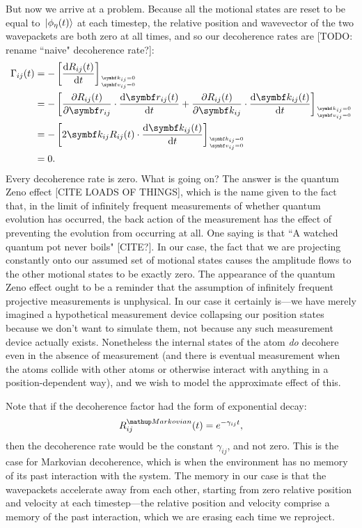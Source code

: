 But now we arrive at a problem. Because all the motional states are reset to be equal to $\ket{\phi_\eta(t)}$ at each timestep, the relative position and wavevector of the two wavepackets are both zero at all times, and so our decoherence rates are [TODO: rename ``naive" decoherence rate?]:
\begin{align}
\Gamma_{ij}(t) &= -\left[\dv{R_{ij}(t)}{t}\right]_{
\stackon[1pt]
{$\scriptscriptstyle\, \vec v_{ij} = 0$}
{$\scriptscriptstyle\, \vec k_{ij} = 0$}
}\\
&= -\left[
\pdv{R_{ij}(t)}{\vec r_{ij}}\cdot \dv{\vec r_{ij}(t)}{t} + 
\pdv{R_{ij}(t)}{\vec k_{ij}}\cdot \dv{\vec k_{ij}(t)}{t}\right]_{
\stackon[1pt]
{$\scriptscriptstyle\, \vec v_{ij} = 0$}
{$\scriptscriptstyle\, \vec k_{ij} = 0$}
}\\
&= -\left[
2\vec k_{ij}R_{ij}(t)\cdot\dv{\vec k_{ij}(t)}{t}\right]_{
\stackon[1pt]
{$\scriptscriptstyle\, \vec v_{ij} = 0$}
{$\scriptscriptstyle\, \vec k_{ij} = 0$}
}\\
&= 0.
\end{align}
Every decoherence rate is zero. What is going on? The answer is the quantum Zeno effect [CITE LOADS OF THINGS], which is the name given to the fact that, in the limit of infinitely frequent measurements of whether quantum evolution has occurred, the back action of the measurement has the effect of preventing the evolution from occurring at all. One saying is that ``A watched quantum pot never boils" [CITE?]. In our case, the fact that we are projecting constantly onto our assumed set of motional states causes the amplitude flows to the other motional states to be exactly zero. The appearance of the quantum Zeno effect ought to be a reminder that the assumption of infinitely frequent projective measurements is unphysical. In our case it certainly is---we have merely imagined a hypothetical measurement device collapsing our position states because we don't want to simulate them, not because any such measurement device actually exists. Nonetheless the internal states of the atom \emph{do} decohere even in the absence of measurement (and there is eventual measurement when the atoms collide with other atoms or otherwise interact with anything in a position-dependent way), and we wish to model the approximate effect of this.

Note that if the decoherence factor had the form of exponential decay:
\begin{align}
R^\up{Markovian}_{ij}(t) = e^{-\gamma_{ij} t}, 
\end{align}
then the decoherence rate would be the constant $\gamma_{ij}$, and not zero. This is the case for Markovian decoherence, which is when the environment has no memory of its past interaction with the system. The memory in our case is that the wavepackets accelerate away from each other, starting from zero relative position and velocity at each timestep---the relative position and velocity comprise a memory of the past interaction, which we are erasing each time we reproject.

